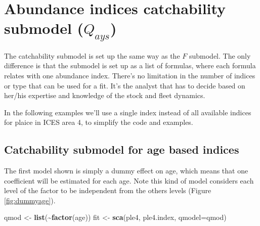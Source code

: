 \documentclass[
]{book}
\newenvironment{Shaded}{\begin{snugshade}}{\end{snugshade}}
\newcommand{\AttributeTok}[1]{\textcolor[rgb]{0.13,0.29,0.53}{#1}}
\newcommand{\FunctionTok}[1]{\textcolor[rgb]{0.13,0.29,0.53}{\textbf{#1}}}
\newcommand{\NormalTok}[1]{#1}
\newcommand{\OtherTok}[1]{\textcolor[rgb]{0.56,0.35,0.01}{#1}}
\newcommand{\SpecialCharTok}[1]{\textcolor[rgb]{0.81,0.36,0.00}{\textbf{#1}}}
\begin{document}
\hypertarget{abundance-indices-catchability-submodel-q_ays}{%
\section{\texorpdfstring{Abundance indices catchability submodel (\(Q_{ays}\))}{Abundance indices catchability submodel (Q\_\{ays\})}}\label{abundance-indices-catchability-submodel-q_ays}}

The catchability submodel is set up the same way as the \(F\) submodel. The only difference is that the submodel is set up as a list of formulas, where each formula relates with one abundance index. There's no limitation in the number of indices or type that can be used for a fit. It's the analyst that has to decide based on her/his expertise and knowledge of the stock and fleet dynamics.

In the following examples we'll use a single index instead of all available indices for plaice in ICES area 4, to simplify the code and examples.

\hypertarget{catchability-submodel-for-age-based-indices}{%
\subsection{Catchability submodel for age based indices}\label{catchability-submodel-for-age-based-indices}}

The first model shown is simply a dummy effect on age, which means that one coefficient will be estimated for each age. Note this kind of model considers each level of the factor to be independent from the others levels (Figure \ref{fig:dummyage}).

\begin{Shaded}
\begin{Highlighting}[]
\NormalTok{qmod }\OtherTok{\textless{}{-}} \FunctionTok{list}\NormalTok{(}\SpecialCharTok{\textasciitilde{}}\FunctionTok{factor}\NormalTok{(age))}
\NormalTok{fit }\OtherTok{\textless{}{-}} \FunctionTok{sca}\NormalTok{(ple4, ple4.index, }\AttributeTok{qmodel=}\NormalTok{qmod)}
\end{Highlighting}
\end{Shaded}
\end{document}
